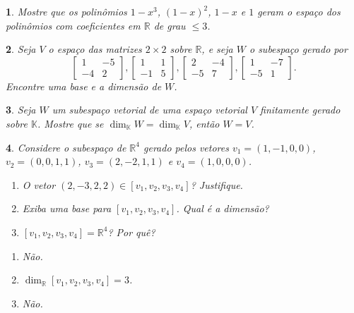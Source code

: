 \documentclass[12pt]{exam}
\newtheorem{exercicio}{}
\newcommand{\real}{\mathbb{R}}
\newcommand{\cp}[1]{\mathbb{#1}}
\begin{document}
\begin{exercicio}
  Mostre que os polin\^omios $1 - x^3$, $(1 - x)^2$, $1 - x$ e $1$ geram o espa\c{c}o dos polin\^omios com coeficientes em $\real$ de grau $\le 3$.
\end{exercicio}

\begin{exercicio}
  Seja $V$ o espa\c{c}o das matrizes $2 \times 2$ sobre $\real$, e seja $W$ o subespa\c{c}o gerado por
  \[
    \begin{bmatrix}
      1 & -5\\
      -4 & 2
    \end{bmatrix},
    \begin{bmatrix}
      1 & 1\\
      -1 & 5
    \end{bmatrix},
    \begin{bmatrix}
      2 & -4\\
      -5 & 7
    \end{bmatrix},
    \begin{bmatrix}
      1 & -7\\
      -5 & 1
    \end{bmatrix}.
  \]
Encontre uma base e a dimens\~ao de $W$.
\end{exercicio}

\begin{exercicio}
  Seja $W$ um subespa\c{c}o vetorial de uma espa\c{c}o vetorial $V$ finitamente gerado sobre $\cp{K}$. Mostre que se $\dim_\cp{K}W = \dim_\cp{K}V$, ent\~ao $W = V$.
\end{exercicio}

\begin{exercicio}
  Considere o subespa\c{c}o de $\real^4$ gerado pelos vetores $v_1 = (1, -1, 0, 0)$, $v_2 = (0, 0, 1, 1)$, $v_3 = (2, -2, 1, 1)$ e $v_4 = (1, 0, 0, 0)$.
  \begin{enumerate}[label={\alph*})]
    \item O vetor $(2, -3, 2, 2) \in [v_1, v_2, v_3, v_4]$? Justifique.
    \item Exiba uma base para $[v_1, v_2, v_3, v_4]$. Qual \'e a dimens\~ao?
    \item $[v_1, v_2, v_3, v_4] = \real^4$? Por qu\^e?
  \end{enumerate}
  \begin{solucao}
    \begin{enumerate}[label={\alph*})]
      \item N\~ao.
      \item $\dim_\real [v_1, v_2, v_3, v_4] = 3$.
      \item N\~ao.
    \end{enumerate}
  \end{solucao}
\end{exercicio}
\end{document}
